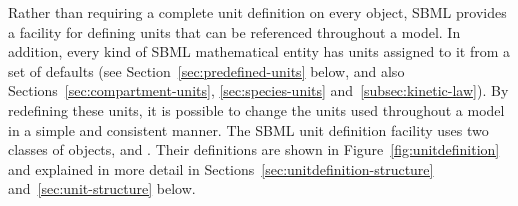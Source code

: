 Rather than requiring a complete unit definition on every
object, SBML provides a facility for defining units that can be
referenced throughout a model.  In addition, every kind of SBML
mathematical entity has units assigned to it from a set of
 defaults (see Section~\ref{sec:predefined-units} below, and
also Sections~\ref{sec:compartment-units}, \ref{sec:species-units}
and~\ref{subsec:kinetic-law}).  By redefining these 
units, it is possible to change the units used throughout
a model in a simple and consistent manner.  The SBML unit
definition facility uses two classes of objects, \UnitDefinition
and \Unit.  Their definitions are shown in
Figure~\vref{fig:unitdefinition} and explained in more detail in
Sections~\ref{sec:unitdefinition-structure}
and~\ref{sec:unit-structure} below.

